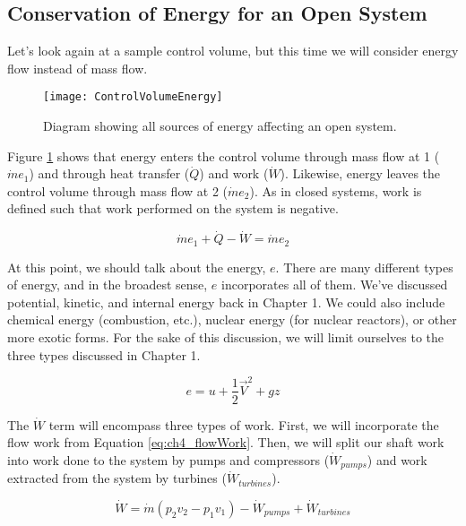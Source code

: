 \subsection{Conservation of Energy for an Open System}
Let's look again at a sample control volume, but this time we will consider energy flow instead of mass flow.

\begin{figure}[H]
\centering
\texttt{[image: ControlVolumeEnergy]}
\caption{Diagram showing all sources of energy affecting an open system.}
\label{fig:ch4_CVenergyConservation}
\end{figure}

Figure \ref{fig:ch4_CVenergyConservation} shows that energy enters the control volume through mass flow at 1 ($\dot{m} e_1$) and through heat transfer ($\dot{Q}$) and work ($\dot{W}$).  Likewise, energy leaves the control volume through mass flow at 2 ($\dot{m} e_2$). As in closed systems, work is defined such that work performed on the system is negative.

\begin{equation*}
  \dot{m} e_1 + \dot{Q} - \dot{W} = \dot{m} e_2
\end{equation*}

At this point, we should talk about the energy, $e$.  There are many different types of energy, and in the broadest sense, $e$ incorporates all of them.  We've discussed potential, kinetic, and internal energy back in Chapter 1.  We could also include chemical energy (combustion, etc.), nuclear energy (for nuclear reactors), or other more exotic forms.  For the sake of this discussion, we will limit ourselves to the three types discussed in Chapter 1.

\begin{equation} \label{eq:energyDefinition}
  e = u + \frac{1}{2}\vec{V}^2 + gz
\end{equation}

The $\dot{W}$ term will encompass three types of work.  First, we will incorporate the flow work from Equation \ref{eq:ch4_flowWork}.  Then, we will split our shaft work into work done to the system by pumps and compressors ($\dot{W}_{pumps}$) and work extracted from the system by turbines ($\dot{W}_{turbines}$).

\begin{equation} \label{eq:flowWork}
  \dot{W} = \dot{m}(p_2 v_2 - p_1 v_1) - \dot{W}_{pumps} + \dot{W}_{turbines}
\end{equation}


